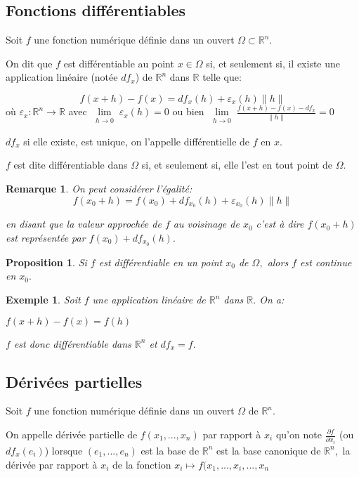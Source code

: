 \documentclass[11pt,a4paper]{report}
\newtheorem{remarque}{Remarque}[section]
\newtheorem{proposition}{Proposition}[section]
\newtheorem{ex}{Exemple}[section]
\begin{document}
\subsection{Fonctions différentiables}

Soit $f$ une fonction numérique définie dans un ouvert $\Omega\subset\mathbb{R}^n.$

On dit que $f$ est différentiable au point $x\in \Omega$ si, et seulement si, il existe une application linéaire (notée $df_x$) de $\mathbb{R}^n$ dans $\mathbb{R}$ telle que:

$$f(x+h)-f(x)=df_x(h)+\varepsilon_x (h)\|h\|$$ où $\varepsilon_x:\mathbb{R}^n\rightarrow \mathbb{R}$ avec $\lim\limits_{\substack{h \rightarrow 0}}\varepsilon_x (h)=0$ ou bien $\lim\limits_{\substack{h \rightarrow 0}} \frac{f(x+h)-f(x)-df_x}{\|h\|}=0$

$df_x$ si elle existe, est unique, on l'appelle différentielle de $f$ en $x.$

$f$ est dite différentiable dans $\Omega$ si, et seulement si, elle l'est en tout point de $\Omega.$
\begin{remarque}
On peut considérer l'égalité:
$$f(x_0+h)=f(x_0)+df_{x_0}(h)+\varepsilon_{x_0}(h)\|h\|$$

en disant que la valeur approchée de $f$ au voisinage de $x_0$ c'est à dire $f(x_0+h)$ est représentée par $f(x_0)+df_{x_0}(h).$
\end{remarque}
\begin{proposition}

Si $f$ est différentiable en un point $x_0$ de $\Omega,$ alors $f$ est continue en $x_0.$
\end{proposition}
\begin{ex}

Soit $f$ une application linéaire de $\mathbb{R}^n$ dans $\mathbb{R}.$ On a:

$f(x+h)-f(x)=f(h)$

$f$ est donc différentiable dans $\mathbb{R}^n$ et $df_x=f.$
\end{ex}
\subsection{Dérivées partielles}
Soit $f$ une fonction numérique définie dans un ouvert $\Omega$ de $\mathbb{R}^n.$

On appelle dérivée partielle de $f(x_1,...,x_n)$ par rapport à $x_i$ qu'on note $\frac{\partial f}{\partial x_i}$ (ou $df_x(e_i)$) lorsque $(e_1,...,e_n)$ est la base de $\mathbb{R}^n$ est la base canonique de $\mathbb{R}^n,$ la dérivée par rapport à $x_i$ de la fonction $x_i\mapsto f(x_1,...,x_i,...,x_n$
\end{document}
